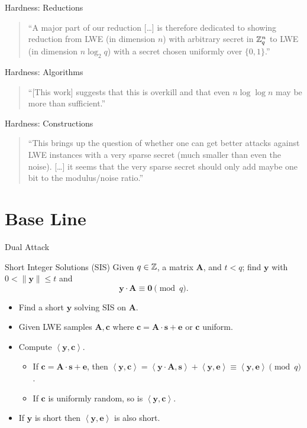 \documentclass[presentation,smaller]{beamer}
\newcommand{\ZZ}[1][blank]{\ensuremath{\ifthenelse{\equal{#1}{blank}}{\mathbb{Z}}{\mathbb{Z}\left[#1\right]}\xspace}}
\newcommand{\ZZq}[1][blank]{\ensuremath{\ifthenelse{\equal{#1}{blank}}{\mathbb{Z}_q}{\mathbb{Z}_q\left[#1\right]}\xspace}}
\renewcommand{\vec}[1]{\ensuremath{\mathbf{#1}}\xspace}
\newcommand{\ip}[2]{\ensuremath{\left\langle {#1},{#2}\right\rangle}\xspace}
\begin{document}
\begin{frame}[label={sec:orgheadline8}]{Hardness: Reductions}
\begin{quote}
“A major part of our reduction [\dots{}] is therefore dedicated to showing  reduction from LWE (in dimension \(n\)) with arbitrary secret in \(\ZZq^n\) to LWE (in dimension \alert{\(n \log_2 q\)}) with a secret chosen uniformly over \(\{0, 1\}\).” 
\end{quote}
\end{frame}

\begin{frame}[label={sec:orgheadline9}]{Hardness: Algorithms}
\begin{quote}
“[This work] suggests that this is overkill and that even \alert{\(n\log\log n\)} may be more than sufficient.”
\end{quote}
\end{frame}

\begin{frame}[label={sec:orgheadline10}]{Hardness: Constructions}
\begin{quote}
“This brings up the question of whether one can get better attacks against LWE instances with a very sparse secret (much smaller than even the noise). [\dots{}] it seems that the very sparse secret should only add maybe \alert{one bit to the modulus/noise ratio}.” 
\end{quote}
\end{frame}

\section{Base Line}
\label{sec:orgheadline25}
\begin{frame}[label={sec:orgheadline12}]{Dual Attack}
\begin{block}{Short Integer Solutions (SIS)}
Given \(q \in \ZZ\), a matrix \(\vec{A}\), and \(t < q\); find \(\vec{y}\) with \(0 < \| \vec{y} \| \leq t\) and \[\vec{y} ⋅ \vec{A} ≡ \vec{0} \pmod{q}.\]
\end{block}

\begin{itemize}
\item Find a short \(\vec{y}\) solving SIS on \(\vec{A}\).
\item Given LWE samples \(\vec{A}, \vec{c}\) where \(\vec{c} = \vec{A}⋅\vec{s} + \vec{e}\) or \(\vec{c}\) uniform.
\item Compute \(\ip{\vec{y}}{\vec{c}}\).
\begin{itemize}
\item If \(\vec{c} = \vec{A}⋅\vec{s} + \vec{e}\), then \(\ip{\vec{y}}{\vec{c}} = \ip{\vec{y}⋅\vec{A}}{\vec{s}} + \ip{\vec{y}}{\vec{e}} \equiv \ip{\vec{y}}{\vec{e}} \pmod{q}\).
\item If \(\vec{c}\) is uniformly random, so is \(\ip{\vec{y}}{\vec{c}}\).
\end{itemize}
\item If \(\vec{y}\) is short then \(\ip{\vec{y}}{\vec{e}}\) is also short.
\end{itemize}
\end{frame}
\end{document}
